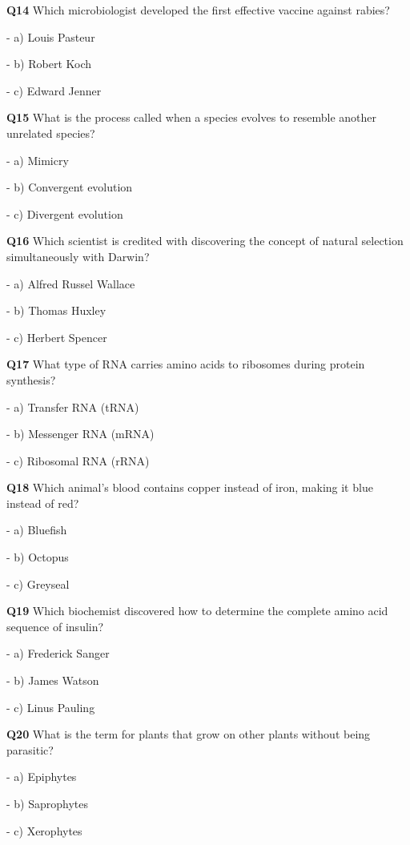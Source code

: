 \textbf{Q14} Which microbiologist developed the first effective vaccine against rabies?\par
\quad - a) Louis Pasteur\par
\quad - b) Robert Koch\par
\quad - c) Edward Jenner\par

\textbf{Q15} What is the process called when a species evolves to resemble another unrelated species?\par
\quad - a) Mimicry\par
\quad - b) Convergent evolution\par
\quad - c) Divergent evolution\par

\textbf{Q16} Which scientist is credited with discovering the concept of natural selection simultaneously with Darwin?\par
\quad - a) Alfred Russel Wallace\par
\quad - b) Thomas Huxley\par
\quad - c) Herbert Spencer\par

\textbf{Q17} What type of RNA carries amino acids to ribosomes during protein synthesis?\par
\quad - a) Transfer RNA (tRNA)\par
\quad - b) Messenger RNA (mRNA)\par
\quad - c) Ribosomal RNA (rRNA)\par

\textbf{Q18} Which animal's blood contains copper instead of iron, making it blue instead of red?\par
\quad - a) Bluefish\par
\quad - b) Octopus\par
\quad - c) Greyseal\par

\textbf{Q19} Which biochemist discovered how to determine the complete amino acid sequence of insulin?\par
\quad - a) Frederick Sanger\par
\quad - b) James Watson\par
\quad - c) Linus Pauling\par

\textbf{Q20} What is the term for plants that grow on other plants without being parasitic?\par
\quad - a) Epiphytes\par
\quad - b) Saprophytes\par
\quad - c) Xerophytes\par

